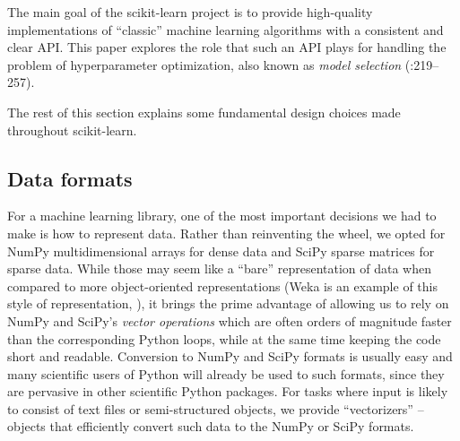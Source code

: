 \documentclass[a4paper,twocolumn]{article}
\newcommand{\Xtr}{\texttt{X\_tr}}
\newcommand{\Xte}{\texttt{X\_te}}
\newcommand{\ytr}{\texttt{y\_tr}}
\newcommand{\yte}{\texttt{y\_te}}
\begin{document}
The main goal of the scikit-learn project
is to provide high-quality implementations
of ``classic'' machine learning algorithms
with a consistent and clear API.
This paper explores the role that such an API plays
for handling the problem of hyperparameter optimization,
also known as \textit{model selection} (\citealp{elemstatlearn}:219--257).

The rest of this section explains some fundamental design choices
made throughout scikit-learn.

\subsection{Data formats}

For a machine learning library, one of the most important decisions we had to
make is how to represent data.  Rather than reinventing the wheel, we opted for
NumPy multidimensional arrays  for dense data and SciPy
sparse matrices for sparse data.  While those may seem like a ``bare''
representation of data when compared to more object-oriented representations
(Weka is an example of this style of representation, \citealp{hall2009weka}),
it brings the prime advantage of allowing us to rely on NumPy and SciPy's
\textit{vector operations} which are often orders of magnitude faster
than the corresponding Python loops,
while at the same time keeping the code short and readable.
Conversion to NumPy and SciPy formats is usually easy and many scientific users
of Python will already be used to such formats, since they are pervasive in
other scientific Python packages.  For tasks where input is likely to consist
of text files or semi-structured objects, we provide ``vectorizers'' -- objects
that efficiently convert such data to the NumPy or SciPy formats.

\end{document}
